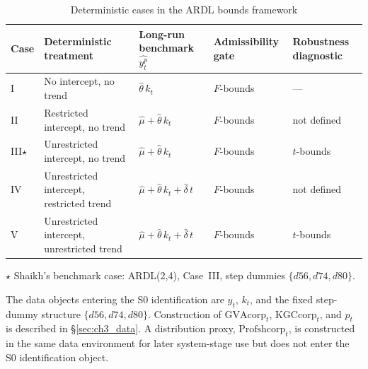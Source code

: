 \documentclass[11pt,a4paper]{article}
\begin{document}
\begin{table}[!ht]
	\centering
	\small
	\caption{Deterministic cases in the ARDL bounds framework}
	\label{tab:pss_cases_yp}
	\begin{tabular}{p{0.8cm}p{3.6cm}p{4.2cm}p{2.0cm}p{2.5cm}}
		\hline\hline
		Case & Deterministic treatment
		& Long-run benchmark $\widehat{y_t^p}$
		& Admissibility gate
		& Robustness diagnostic \\
		\hline
		I   & No intercept, no trend
		& $\widehat{\theta}\,k_t$
		& $F$-bounds & --- \\[2pt]
		II  & Restricted intercept, no trend
		& $\widehat{\mu} + \widehat{\theta}\,k_t$
		& $F$-bounds & not defined \\[2pt]
		III$\star$
		& Unrestricted intercept, no trend
		& $\widehat{\mu} + \widehat{\theta}\,k_t$
		& $F$-bounds & $t$-bounds \\[2pt]
		IV  & Unrestricted intercept, restricted trend
		& $\widehat{\mu} + \widehat{\theta}\,k_t + \widehat{\delta}\,t$
		& $F$-bounds & not defined \\[2pt]
		V   & Unrestricted intercept, unrestricted trend
		& $\widehat{\mu} + \widehat{\theta}\,k_t + \widehat{\delta}\,t$
		& $F$-bounds & $t$-bounds \\
		\hline
	\end{tabular}
	\par\vspace{0.3em}
	\footnotesize $\star$ Shaikh's benchmark case: ARDL(2,4), Case~III,
	step dummies $\{d56, d74, d80\}$.
\end{table}


The data objects entering the S0 identification are $y_t$, $k_t$, and the
fixed step-dummy structure $\{d56, d74, d80\}$. Construction of
$\text{GVAcorp}_t$, $\text{KGCcorp}_t$, and $p_t$ is described in
\S\ref{sec:ch3_data}. A distribution proxy, $\text{Profshcorp}_t$, is
constructed in the same data environment for later system-stage use but does
not enter the S0 identification object.

\end{document}
